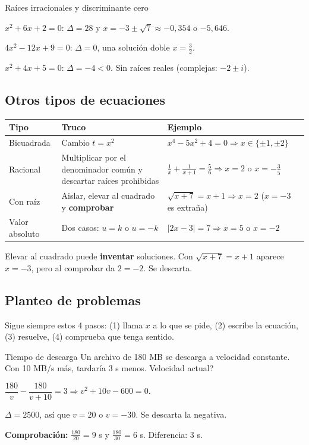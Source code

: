 \begin{tmejemplo}{Ra\'ices irracionales y discriminante cero}
\begin{tmpasos}
\item $x^2+6x+2=0$: $\Delta=28$ y $x=-3\pm\sqrt7\approx-0{,}354$ o $-5{,}646$.
\item $4x^2-12x+9=0$: $\Delta=0$, una soluci\'on doble $x=\frac32$.
\item $x^2+4x+5=0$: $\Delta=-4<0$. Sin ra\'ices reales (complejas: $-2\pm i$).
\end{tmpasos}
\end{tmejemplo}

\subsection{Otros tipos de ecuaciones}
\begin{center}
\begin{tabular}{|p{2.6cm}|p{4.4cm}|p{5.6cm}|}
\hline
\rowcolor{tmAzulClaro}\textbf{Tipo} & \textbf{Truco} & \textbf{Ejemplo}\\ \hline
Bicuadrada & Cambio $t=x^2$ & $x^4-5x^2+4=0\Rightarrow x\in\{\pm1,\pm2\}$\\ \hline
Racional & Multiplicar por el denominador com\'un y descartar ra\'ices prohibidas & $\frac1x+\frac1{x+1}=\frac56\Rightarrow x=2$ o $x=-\frac35$\\ \hline
Con ra\'iz & Aislar, elevar al cuadrado y \textbf{comprobar} & $\sqrt{x+7}=x+1\Rightarrow x=2$ ($x=-3$ es extra\~na)\\ \hline
Valor absoluto & Dos casos: $u=k$ o $u=-k$ & $|2x-3|=7\Rightarrow x=5$ o $x=-2$\\ \hline
\end{tabular}
\end{center}

\begin{tmcuidado}Elevar al cuadrado puede \textbf{inventar} soluciones. Con $\sqrt{x+7}=x+1$ aparece $x=-3$, pero al comprobar da $2=-2$. Se descarta.\end{tmcuidado}

\subsection{Planteo de problemas}
Sigue siempre estos 4 pasos: (1) llama $x$ a lo que se pide, (2) escribe la ecuaci\'on, (3) resuelve, (4) comprueba que tenga sentido.

\begin{tmejemplo}{Tiempo de descarga}
Un archivo de 180 MB se descarga a velocidad constante. Con 10 MB/s m\'as, tardar\'ia 3 s menos. \textquestiondown Velocidad actual?
\begin{tmpasos}
\item $\dfrac{180}{v}-\dfrac{180}{v+10}=3\Rightarrow v^2+10v-600=0$.
\item $\Delta=2500$, as\'i que $v=20$ o $v=-30$. Se descarta la negativa.
\item \textbf{Comprobaci\'on:} $\frac{180}{20}=9$ s y $\frac{180}{30}=6$ s. Diferencia: 3 s.
\end{tmpasos}
\end{tmejemplo}

